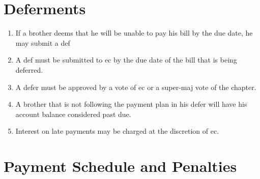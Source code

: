 \section{Deferments}
\label{def}
	\begin{enumerate}
		\item If a brother deems that he will be unable to pay his bill by the due date, he may submit a \gls{def}
		\item A \gls{def} must be submitted to \gls{ec} by the due date of the bill that is being deferred. 
		\item A \gls{defer} must be approved by a vote of \gls{ec} or a \gls{super-maj} vote of the chapter.
		\item A brother that is not following the payment plan in his \gls{defer} will have his account balance considered past due.
		\item Interest on late payments may be charged at the discretion of \gls{ec}.
	\end{enumerate}

\section{Payment Schedule and Penalties}

